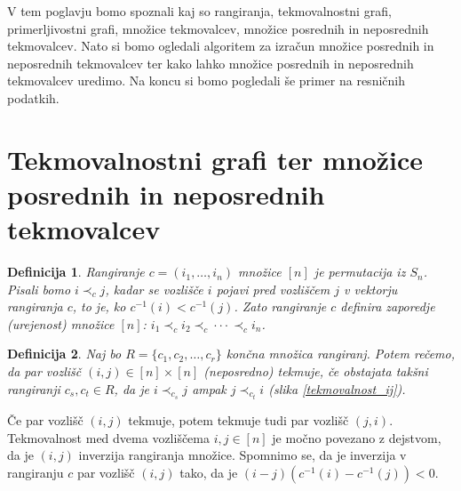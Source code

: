 \documentclass[a4paper, 12pt]{book}
\newtheorem{definicija}{Definicija}[chapter]
\begin{document}
V tem poglavju bomo spoznali kaj so rangiranja, tekmovalnostni grafi, primerljivostni grafi, množice tekmovalcev, množice posrednih in neposrednih tekmovalcev. Nato si bomo ogledali algoritem za izračun množice posrednih in neposrednih tekmovalcev ter kako lahko množice posrednih in neposrednih tekmovalcev uredimo. Na koncu si bomo pogledali še primer na resničnih podatkih.

\section{ Tekmovalnostni grafi ter množice posrednih in neposrednih tekmovalcev }

\begin{definicija}
    Rangiranje $c = (i_1, \dots, i_n)$ množice $[n]$ je permutacija iz $S_n$. Pisali bomo $i \prec_c j$, kadar se vozlišče $i$ pojavi pred vozliščem $j$ v vektorju rangiranja $c$, to je, ko $c^{-1}(i) < c^{-1}(j)$. Zato rangiranje $c$ definira zaporedje (urejenost) množice $[n]$: $i_1 \prec_c i_2 \prec_c \cdot\cdot\cdot \prec_c i_n$.
    
\end{definicija}

\begin{definicija}
\label{def_tekmovalnosti}
    Naj bo $R = \{c_1, c_2, \dots, c_r\}$ končna množica rangiranj. Potem rečemo, da par vozlišč $(i, j) \in [n] \times [n]$ (neposredno) tekmuje, če obstajata takšni rangiranji $c_s, c_t \in R$, da je $i \prec_{c_s} j$ ampak $j \prec_{c_t} i$ (slika \ref{tekmovalnost_ij}).
\end{definicija}

Če par vozlišč $(i, j)$ tekmuje, potem tekmuje tudi par vozlišč $(j, i)$.
Tekmovalnost med dvema vozliščema $i, j \in [n]$ je močno povezano z dejstvom, da je $(i, j)$ inverzija rangiranja množice. Spomnimo se, da je inverzija v rangiranju $c$ par vozlišč $(i, j)$ tako, da je $(i-j)(c^{-1}(i) - c^{-1}(j)) < 0$.
\end{document}
